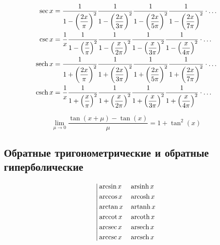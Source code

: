 \begin{equation*}
\begin{aligned}
\sec{x} &=
\frac{1}{1 - \left(\displaystyle \frac{2 x}{\pi} \right)^2}
\frac{1}{1 - \left(\displaystyle \frac{2 x}{3 \pi} \right)^2}
\frac{1}{1 - \left(\displaystyle \frac{2 x}{5 \pi} \right)^2}
\frac{1}{1 - \left(\displaystyle \frac{2 x}{7 \pi} \right)^2}
\cdot \ldots \\
\csc{x} &= \frac{1}{x} 
\frac{1}{1 - \left(\displaystyle \frac{x}{\pi} \right)^2}
\frac{1}{1 - \left(\displaystyle \frac{x}{2 \pi} \right)^2}
\frac{1}{1 - \left(\displaystyle \frac{x}{3 \pi} \right)^2}
\frac{1}{1 - \left(\displaystyle \frac{x}{4 \pi} \right)^2}
\cdot \ldots \\
\operatorname{sech}{x} &=
\frac{1}{1 + \left(\displaystyle \frac{2 x}{\pi} \right)^2}
\frac{1}{1 + \left(\displaystyle \frac{2 x}{3 \pi} \right)^2}
\frac{1}{1 + \left(\displaystyle \frac{2 x}{5 \pi} \right)^2}
\frac{1}{1 + \left(\displaystyle \frac{2 x}{7 \pi} \right)^2}
\cdot \ldots \\
\operatorname{csch}{x} &= \frac{1}{x} 
\frac{1}{1 + \left(\displaystyle \frac{x}{\pi} \right)^2}
\frac{1}{1 + \left(\displaystyle \frac{x}{2 \pi} \right)^2}
\frac{1}{1 + \left(\displaystyle \frac{x}{3 \pi} \right)^2}
\frac{1}{1 + \left(\displaystyle \frac{x}{4 \pi} \right)^2}
\cdot \ldots \\
\end{aligned}
\end{equation*}

\begin{equation*}
\lim_{\mu \to 0}\frac{\tan{(x + \mu)} - \tan(x)}{\mu} = 1 + \tan^2(x)
\end{equation*}

\subsection{Обратные тригонометрические и обратные гиперболические}

\begin{equation*}
\left|
\begin{aligned}
&\arcsin{x} & &\operatorname{arsinh}{x} \\
&\arccos{x} & &\operatorname{arcosh}{x} \\
&\arctan{x} & &\operatorname{artanh}{x} \\
&\operatorname{arccot}{x} & &\operatorname{arcoth}{x} \\
&\operatorname{arcsec}{x} & &\operatorname{arsech}{x} \\
&\operatorname{arccsc}{x} & &\operatorname{arcsch}{x} \\
\end{aligned}
\right.
\end{equation*}

